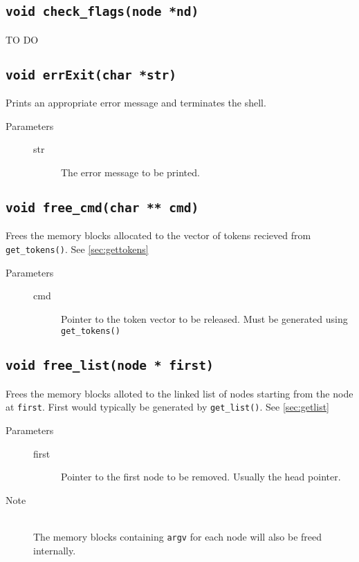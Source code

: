\documentclass{article}
\begin{document}
\subsection{\lstinline{void check_flags(node *nd)}}
TO DO

\subsection{\lstinline{void errExit(char *str)}}
Prints an appropriate error message and terminates the shell. 
\begin{description}
	\item[Parameters]\hfill
	\begin{description}
		\item[str] The error message to be printed.
	\end{description}
\end{description}

\subsection{\lstinline{void free_cmd(char ** cmd)}} \label{sec:freecmd}
Frees the memory blocks allocated to the vector of tokens recieved from \lstinline{get_tokens()}. See \ref{sec:gettokens}
\begin{description}
	\item[Parameters]\hfill
	\begin{description}
		\item[cmd] Pointer to the token vector to be released. Must be generated using \lstinline{get_tokens()}
	\end{description}
\end{description}

\subsection{\lstinline{void free_list(node * first)}} \label{sec:freelist}
Frees the memory blocks alloted to the linked list of nodes starting from the node at \lstinline{first}. First would typically be generated by \lstinline{get_list()}. See \ref{sec:getlist}
\begin{description}
	\item[Parameters]\hfill
	\begin{description}
		\item[first] Pointer to the first node to be removed. Usually the head pointer. 
	\end{description}
	\item[Note]\hfill\\
		The memory blocks containing \lstinline{argv} for each node will also be freed internally.
\end{description}
\end{document}
